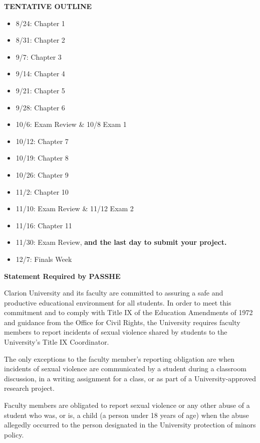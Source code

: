 \documentclass{article}
\begin{document}
\begin{center}
\vspace*{5pt}
{\bf TENTATIVE OUTLINE}
\end{center}
\begin{itemize}
\item 8/24: Chapter 1
\item 8/31: Chapter 2 
\item 9/7: Chapter 3 
\item 9/14: Chapter 4
\item 9/21: Chapter 5
\item 9/28: Chapter 6
\item 10/6: Exam Review \& 10/8 Exam 1
\item 10/12: Chapter 7
\item 10/19: Chapter 8
\item 10/26: Chapter 9
\item 11/2: Chapter 10
\item 11/10: Exam Review \& 11/12 Exam 2
\item 11/16: Chapter 11
\item 11/30: Exam Review, {\bf and the last day to submit your project.}
\item 12/7: Finals Week
\end{itemize}

\clearpage

\begin{center}
{\bf Statement Required by PASSHE}  
\end{center}

Clarion University and its faculty are committed to assuring a safe and productive educational environment for all students. In order to meet this commitment and to comply with Title IX of the Education Amendments of 1972 and guidance from  the Office for Civil Rights, the University requires faculty members to report incidents of sexual violence shared by students to the University's Title IX Coordinator.                         

The only exceptions to the faculty member's reporting obligation are when incidents of sexual violence are communicated by a student during a classroom discussion, in a writing assignment for a class, or as part of a University-approved research project.                           

Faculty members are obligated to report sexual violence or any other abuse of a student who was, or is, a child (a person under 18 years of age) when the abuse allegedly occurred to the person designated in the University protection of minors policy. 
\end{document}
